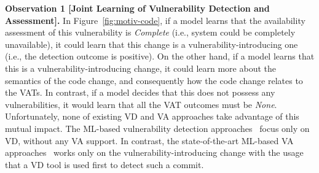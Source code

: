 


\vspace{2pt}
{\bf Observation 1 [Joint Learning of Vulnerability Detection and Assessment].} In Figure~\ref{fig:motiv-code}, if a model learns that the availability assessment of this vulnerability is {\em Complete} (i.e., system could be completely unavailable), it could learn that this change is a vulnerability-introducing one (i.e., the
detection outcome is positive). On the other hand, if a model learns that this is a vulnerability-introducing change, it could learn more about the semantics of the code change, and consequently how the code change relates to the VATs. In contrast, if a model decides that this does not possess any vulnerabilities, it would learn that all the VAT outcomes must be {\em None}. Unfortunately, none of existing VD and VA approaches take advantage of this mutual impact. The ML-based vulnerability detection approaches~\cite{perl2015vccfinder,zhou2017automated,chen2019large} focus only on VD, without any VA support. In contrast, the state-of-the-art ML-based VA approaches~\cite{deepCVA-ase21} works only on the vulnerability-introducing change with the usage that a VD tool is used first to detect such a commit.

